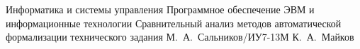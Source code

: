 \documentclass{bmstu}
\begin{document}
	
	\makeresearchtitle
	{Информатика и системы управления}
	{Программное обеспечение ЭВМ и информационные технологии}
	{Сравнительный анализ методов автоматической формализации технического задания}
	{М.~А.~Сальников/ИУ7-13М}
	{К.~А.~Майков}
	{}
	
	\setcounter{page}{2}

	\maketableofcontents
	
	
	
	
	
	
	
	\makebibliography
	
	
	
	
\end{document}
